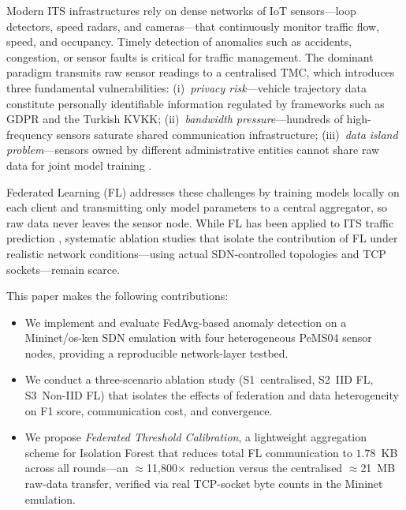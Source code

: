 \documentclass[conference]{IEEEtran}
\begin{document}
Modern ITS infrastructures rely on dense networks of IoT sensors---loop
detectors, speed radars, and cameras---that continuously monitor traffic
flow, speed, and occupancy.
Timely detection of anomalies such as accidents, congestion, or sensor
faults is critical for traffic management.
The dominant paradigm transmits raw sensor readings to a centralised TMC,
which introduces three fundamental vulnerabilities:
(i)~\textit{privacy risk}---vehicle trajectory data constitute personally
identifiable information regulated by frameworks such as GDPR and the
Turkish KVKK;
(ii)~\textit{bandwidth pressure}---hundreds of high-frequency sensors
saturate shared communication infrastructure;
(iii)~\textit{data island problem}---sensors owned by different
administrative entities cannot share raw data for joint model training
\cite{liu2021deep}.

Federated Learning (FL) \cite{mcmahan2017communication} addresses these
challenges by training models locally on each client and transmitting
only model parameters to a central aggregator, so raw data never leaves
the sensor node.
While FL has been applied to ITS traffic prediction
\cite{xia2023short,yuan2023fedSTN}, systematic ablation studies that
isolate the contribution of FL under realistic network conditions---using
actual SDN-controlled topologies and TCP sockets---remain scarce.

This paper makes the following contributions:
\begin{itemize}
  \item We implement and evaluate FedAvg-based anomaly detection on a
        Mininet/os-ken SDN emulation with four heterogeneous PeMS04
        sensor nodes, providing a reproducible network-layer testbed.
  \item We conduct a three-scenario ablation study (S1~centralised,
        S2~IID FL, S3~Non-IID FL) that isolates the effects of
        federation and data heterogeneity on F1 score, communication
        cost, and convergence.
  \item We propose \textit{Federated Threshold Calibration}, a
        lightweight aggregation scheme for Isolation Forest that
        reduces total FL communication to $1.78$~KB across all
        rounds---an $\approx$11,800$\times$ reduction versus the
        centralised $\approx$21~MB raw-data transfer, verified via
        real TCP-socket byte counts in the Mininet emulation.
\end{itemize}

\end{document}
